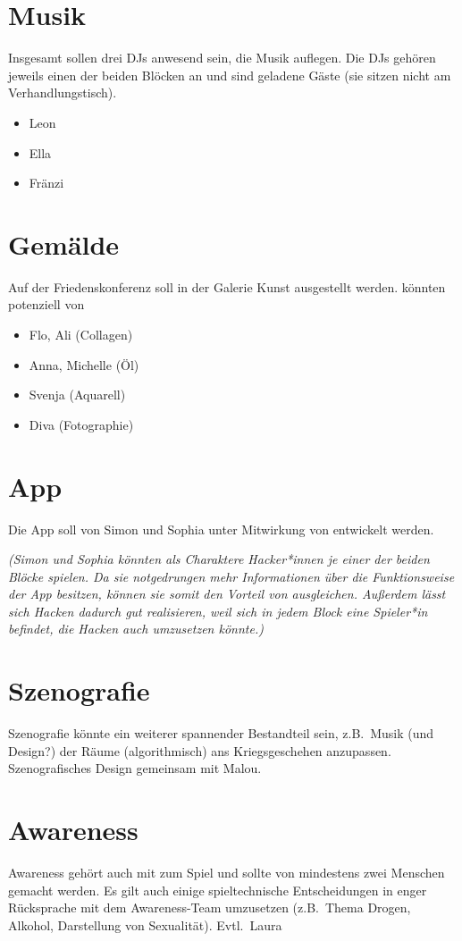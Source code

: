\section{Musik}
Insgesamt sollen drei DJs anwesend sein, die Musik auflegen. Die DJs gehören
jeweils einen der beiden Blöcken an und sind geladene Gäste (sie sitzen nicht am
Verhandlungstisch).
\begin{itemize} 
  \item Leon 
  \item Ella
  \item Fränzi
\end{itemize}

\section{Gemälde} 
Auf der Friedenskonferenz soll in der Galerie Kunst ausgestellt werden.
 könnten potenziell von 
\begin{itemize} 
  \item Flo, Ali (Collagen) 
  \item Anna, Michelle (Öl)
  \item Svenja (Aquarell) 
  \item Diva (Fotographie)
\end{itemize}

\section{App} 
Die App soll von Simon und Sophia unter Mitwirkung von \creators{} entwickelt
werden.

\emph{(Simon und Sophia könnten als Charaktere Hacker*innen je einer der beiden Blöcke
spielen. Da sie notgedrungen mehr Informationen über die Funktionsweise der App
besitzen, können sie somit den Vorteil von \creators{} ausgleichen. Außerdem
lässt sich Hacken dadurch gut realisieren, weil sich in jedem Block eine
Spieler*in befindet, die Hacken auch umzusetzen könnte.)}

\section{Szenografie}
Szenografie könnte ein weiterer spannender Bestandteil sein, z.B.~Musik (und
Design?) der Räume (algorithmisch) ans Kriegsgeschehen anzupassen.
Szenografisches Design gemeinsam mit Malou.

\section{Awareness}
Awareness gehört auch mit zum Spiel und sollte von mindestens zwei Menschen
gemacht werden. Es gilt auch einige spieltechnische Entscheidungen in enger
Rücksprache mit dem Awareness-Team umzusetzen (z.B.~Thema Drogen, Alkohol,
Darstellung von Sexualität). Evtl.~Laura
